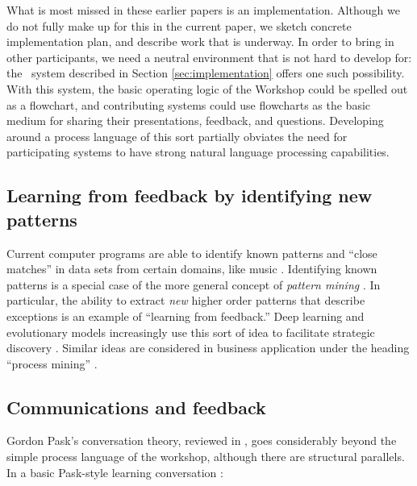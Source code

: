 What is most missed in these earlier papers is an implementation.
Although we do not fully make up for this in the current paper, we
sketch concrete implementation plan, and describe work that is
underway.  In order to bring in other participants, we need a neutral
environment that is not hard to develop for: the \Fw\ system described
in Section \ref{sec:implementation} offers one such possibility.  With
this system, the basic operating logic of the Workshop could be
spelled out as a flowchart, and contributing systems could use
flowcharts as the basic medium for sharing their presentations,
feedback, and questions.  Developing around a process language of this
sort partially obviates the need for participating systems to have
strong natural language processing capabilities.

\subsection{Learning from feedback by identifying new patterns}

Current computer programs are able to identify known patterns and
``close matches'' in data sets from certain domains, like music
\cite{meredith2002algorithms}.  Identifying known patterns is a
special case of the more general concept of \emph{pattern mining}
\cite{bergeron2007representation}.  In particular, the ability to
extract \emph{new} higher order patterns that describe exceptions is
an example of ``learning from feedback.''  Deep learning and
evolutionary models increasingly use this sort of idea to facilitate
strategic discovery \cite{samothrakis2011approximating}.  Similar
ideas are considered in business application under the heading
``process mining'' \cite{van2011process}.

\subsection{Communications and feedback}

Gordon Pask's conversation theory, reviewed in
\cite{conversation-theory-review,boyd2004conversation}, goes
considerably beyond the simple process language of the workshop,
although there are structural parallels.  In a basic Pask-style
learning conversation \cite[p. 190]{boyd2004conversation}: 

